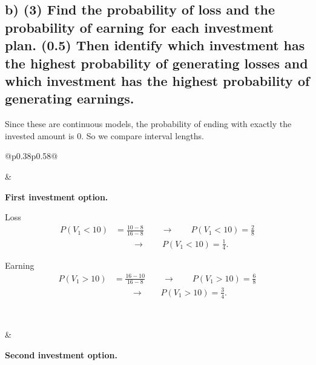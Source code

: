 
\subsection*{b) \textbf{(3)} Find the probability of loss and the probability of earning for each investment plan. \textbf{(0.5)} Then identify which investment has the highest probability of generating losses and which investment has the highest probability of generating earnings.}
\label{subsec:first-investment-product-resale-plans-c1-b}
Since these are continuous models, the probability of ending with exactly the invested amount is $0$. So we compare interval lengths.

\begin{center}
	\setlength{\tabcolsep}{3pt}
	\renewcommand{\arraystretch}{1.08}
	\begin{tabular}{@{}p{0.38\textwidth}p{0.58\textwidth}@{}}
		\begin{minipage}[c]{\linewidth}
			\centering
		\end{minipage}
		&
		\begin{minipage}[c]{\linewidth}
			\textbf{First investment option.}
			
			Loss
			\[
			\begin{aligned}
				P(V_1<10)&=\frac{10-8}{16-8}
				\qquad \longrightarrow \qquad
				P(V_1<10)=\frac{2}{8}\\
				&\qquad \longrightarrow \qquad
				P(V_1<10)=\frac14.
			\end{aligned}
			\]
			
			Earning
			\[
			\begin{aligned}
				P(V_1>10)&=\frac{16-10}{16-8}
				\qquad \longrightarrow \qquad
				P(V_1>10)=\frac{6}{8}\\
				&\qquad \longrightarrow \qquad
				P(V_1>10)=\frac34.
			\end{aligned}
			\]
		\end{minipage}
		\\[0.4em]
		
		\begin{minipage}[c]{\linewidth}
			\centering
		\end{minipage}
		&
		\begin{minipage}[c]{\linewidth}
			\textbf{Second investment option.}
			

\end{minipage}
\end{tabular}
\end{center}
